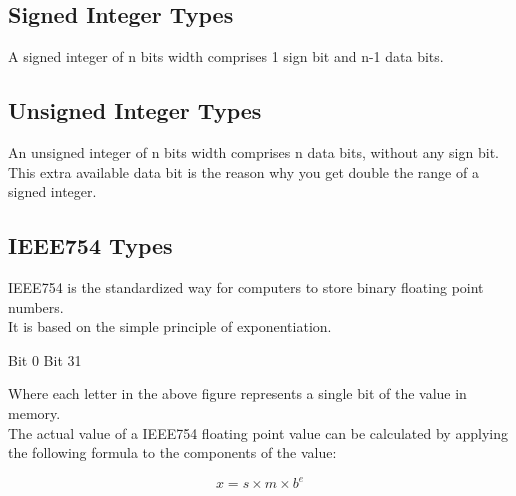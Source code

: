 \color{type_class_sint}
\subsection{Signed Integer Types} \label{subsec:signed-integer-types}
\color{secondary_fg}
A signed integer of n bits width comprises 1 sign bit and n-1 data bits.

\color{type_class_uint}
\subsection{Unsigned Integer Types} \label{subsec:unsigned-integer-types}
\color{secondary_fg}
An unsigned integer of n bits width comprises n data bits, without any sign bit.\\
This extra available data bit is the reason why you get double the range of a
signed integer.

\color{type_class_ieee}
\subsection{IEEE754 Types} \label{subsec:ieee754-types}
\color{secondary_fg}
IEEE754 is the standardized way for computers to store binary floating point numbers.\\
It is based on the simple principle of exponentiation.

\begin{center}
    Bit 0
    Bit 31
\end{center}

\noindent
Where each letter in the above figure represents a single bit of the value in memory.\\
The actual value of a IEEE754 floating point value can be calculated by applying the
following formula to the components of the value:

\begin{center}
    \fontsize{18}{0} \selectfont
    \begin{equation*}
        x=s \times m \times b^e
    \end{equation*}
    \normalfont \selectfont
\end{center}

